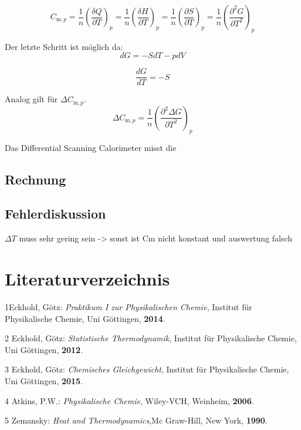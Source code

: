 \documentclass[a4paper,12pt,oneside,onecolum,final,openany]{report}
\begin{document}
\begin{equation}
C_{\mathrm{m},p} =\frac{1}{n} \left(\frac{\delta Q}{\partial T}\right)_p =\frac{1}{n} \left(\frac{\delta H}{\partial T}\right)_p = \frac{1}{n} \left(\frac{\partial S}{\partial T}\right)_p= \frac{1}{n} \left(\frac{\partial^2 G}{\partial T^2}\right)_p
\end{equation}

Der letzte Schritt ist möglich da:\\

\begin{equation}
dG =-SdT -pdV
\end{equation}

\begin{equation}
\frac{dG}{dT}= -S
\end{equation}

Analog gilt für $\Delta C_{\mathrm{m},p}$.\\

\begin{equation}
\Delta C_{\mathrm{m},p} = \frac{1}{n} \left(\frac{\partial^2 \Delta G}{\partial T^2}\right)_p
\end{equation}

Das Differential Scanning Calorimeter misst die 





\section{Rechnung}
\section{Fehlerdiskussion}
$\Delta T$ muss sehr gering sein -> sonst ist Cm nicht konstant und auswertung falsch

\chapter{Literaturverzeichnis}
1\quad Eckhold, Götz: \emph{Praktikum I zur Physikalischen Chemie}, Institut für Physikalische Chemie, Uni Göttingen, \textbf{2014}.

\vspace{0,5 cm}

2 \quad Eckhold, Götz: \emph{Statistische Thermodynamik}, Institut für Physikalische Chemie, Uni Göttingen, \textbf{2012}.

\vspace{0,5cm}

3 \quad Eckhold, Götz: \emph{Chemisches Gleichgewicht}, Institut für Physikalische Chemie, Uni Göttingen, \textbf{2015}.\\

\vspace{0,5cm}

4 \quad Atkins, P.W.: \emph{Physikalische Chemie}, Wiley-VCH, Weinheim, \textbf{2006}.\\

\vspace{0,5cm}

5 \quad Zemansky: \emph{Heat and Thermodynamics},Mc Graw-Hill, New York, \textbf{1990}.\\
\end{document}
